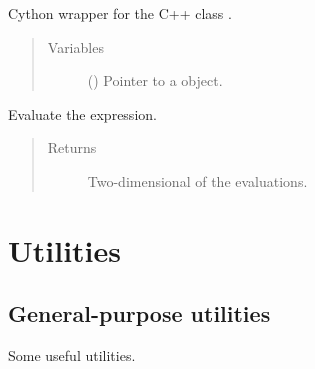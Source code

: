 \documentclass[letterpaper,10pt,english]{sphinxmanual}
\begin{document}
\begin{fulllineitems}
\label{\detokenize{api:tasmania.grids.parser.parser_2d.Parser2d}}
Cython wrapper for the C++ class .
\begin{quote}\begin{description}
\item[{Variables}] \leavevmode
{} () \textendash{} Pointer to a  object.

\end{description}\end{quote}

\begin{fulllineitems}
\label{\detokenize{api:tasmania.grids.parser.parser_2d.Parser2d.evaluate}}
Evaluate the expression.
\begin{quote}\begin{description}
\item[{Returns}] \leavevmode
Two-dimensional  of the evaluations.

\end{description}\end{quote}

\end{fulllineitems}


\end{fulllineitems}



\section{Utilities}
\label{\detokenize{api:utilities}}

\subsection{General-purpose utilities}
\label{\detokenize{api:general-purpose-utilities}}\label{\detokenize{api:module-tasmania.utils.utils}}
Some useful utilities.
\end{document}
